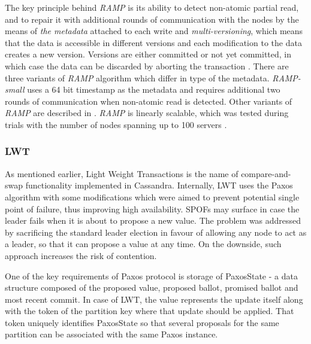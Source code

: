 The key principle behind \emph{RAMP} is its ability to detect non-atomic partial read, and to repair it with additional rounds of communication with the nodes by the means of \emph{the metadata} attached to each write and \emph{multi-versioning}, which means that the data is accessible in different versions and each modification to the data creates a new version. Versions are either committed or not yet committed, in which case the data can be discarded by aborting the transaction \cite[p. 6]{Bailis:2014}. 
There are three variants of \emph{RAMP} algorithm which differ in type of the metadata. \emph{RAMP-small} uses a 64 bit timestamp as the metadata and requires additional two rounds of communication when non-atomic read is detected. Other variants of \emph{RAMP} are described in \cite[p. 5]{Bailis:2014}.
\emph{RAMP} is linearly scalable, which was tested during trials with the number of nodes spanning up to 100 servers \cite[p. 10]{Bailis:2014}.

%

\subsubsection{LWT}\label{sec:theory:transactions:lwt}
As mentioned earlier, Light Weight Transactions is the name of compare-and-swap functionality implemented in Cassandra. Internally, LWT uses the Paxos algorithm with some modifications which were aimed to prevent potential single point of failure, thus improving high availability. SPOFs may surface in case the leader fails when it is about to propose a new value. The problem was addressed by sacrificing the standard leader election in favour of allowing any node to act as a leader, so that it can propose a value at any time. On the downside, such approach increases the risk of contention. 

One of the key requirements of Paxos protocol is storage of PaxosState - a data structure composed of the proposed value, proposed ballot, promised ballot and most recent commit. In case of LWT, the value represents the update itself along with the token of the partition key where that update should be applied. That token uniquely identifies PaxosState so that several proposals for the same partition can be associated with the same Paxos instance. 


